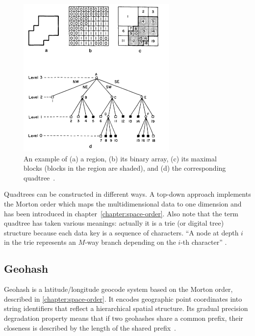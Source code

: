 \begin{figure}[h]
  \begin{center}
    \includegraphics[width=0.7\textwidth]{figures/quadtree.png}
    \caption{An example of (a) a region, (b) its binary array, (c) its maximal blocks (blocks in the region are shaded), and (d) the corresponding quadtree~\cite[p 3]{Samet90spatialdata}.}
    \label{fig:space-decompositions}
  \end{center}
\end{figure}

Quadtrees can be constructed in different ways. A top-down approach implements the Morton order which maps the multidimensional data to one dimension and has been introduced in chapter~\ref{chapter:space-order}. Also note that the term quadtree has taken various meanings: actually it is a trie (or digital tree) structure because each data key is a sequence of characters. ``A node at depth $i$ in the trie represents an $M$-way branch depending on the $i$-th character'' \cite{Samet90spatialdata}.

\subsection{Geohash}
\label{chapter:geohash}

Geohash is a latitude/longitude geocode system based on the Morton order, described in \ref{chapter:space-order}. It encodes geographic point coordinates into string identifiers that reflect a hierarchical spatial structure. Its gradual precision degradation property means that if two geohashes share a common prefix, their closeness is described by the length of the shared prefix~\cite{wiki:geohash, Smiley11geohash}.

